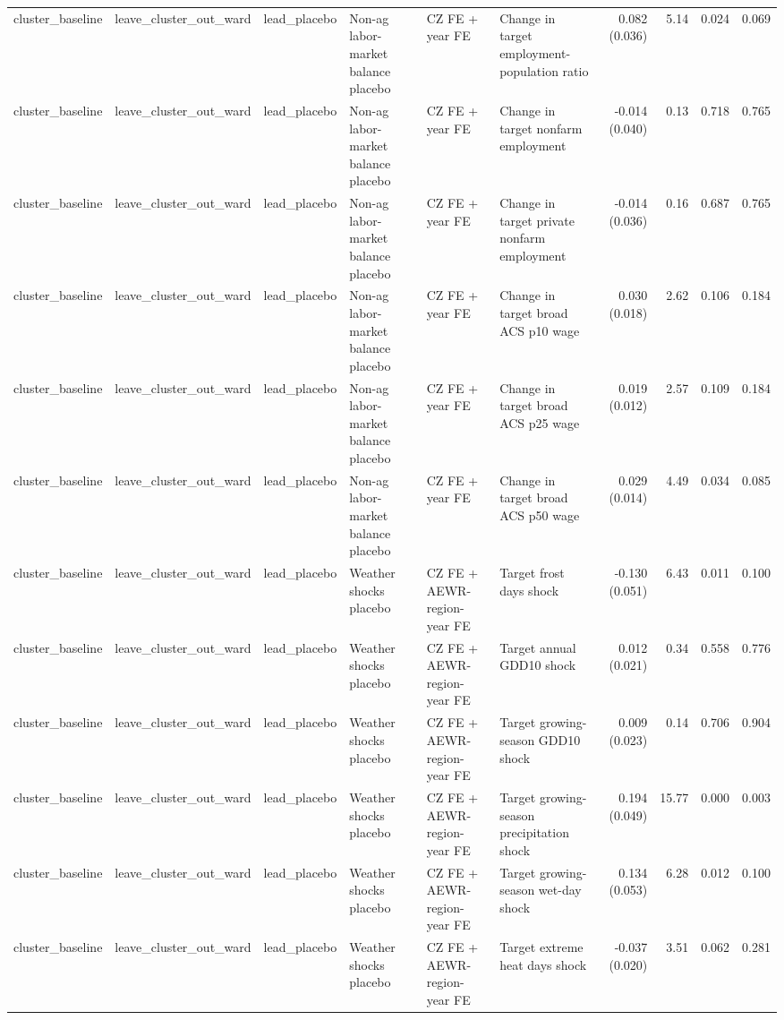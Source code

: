 \begin{tabular}{llllllrrrr}
cluster_baseline & leave_cluster_out_ward & lead_placebo & Non-ag labor-market balance placebo & CZ FE + year FE & Change in target employment-population ratio & 0.082 (0.036) & 5.14 & 0.024 & 0.069 \\
cluster_baseline & leave_cluster_out_ward & lead_placebo & Non-ag labor-market balance placebo & CZ FE + year FE & Change in target nonfarm employment & -0.014 (0.040) & 0.13 & 0.718 & 0.765 \\
cluster_baseline & leave_cluster_out_ward & lead_placebo & Non-ag labor-market balance placebo & CZ FE + year FE & Change in target private nonfarm employment & -0.014 (0.036) & 0.16 & 0.687 & 0.765 \\
cluster_baseline & leave_cluster_out_ward & lead_placebo & Non-ag labor-market balance placebo & CZ FE + year FE & Change in target broad ACS p10 wage & 0.030 (0.018) & 2.62 & 0.106 & 0.184 \\
cluster_baseline & leave_cluster_out_ward & lead_placebo & Non-ag labor-market balance placebo & CZ FE + year FE & Change in target broad ACS p25 wage & 0.019 (0.012) & 2.57 & 0.109 & 0.184 \\
cluster_baseline & leave_cluster_out_ward & lead_placebo & Non-ag labor-market balance placebo & CZ FE + year FE & Change in target broad ACS p50 wage & 0.029 (0.014) & 4.49 & 0.034 & 0.085 \\
cluster_baseline & leave_cluster_out_ward & lead_placebo & Weather shocks placebo & CZ FE + AEWR-region-year FE & Target frost days shock & -0.130 (0.051) & 6.43 & 0.011 & 0.100 \\
cluster_baseline & leave_cluster_out_ward & lead_placebo & Weather shocks placebo & CZ FE + AEWR-region-year FE & Target annual GDD10 shock & 0.012 (0.021) & 0.34 & 0.558 & 0.776 \\
cluster_baseline & leave_cluster_out_ward & lead_placebo & Weather shocks placebo & CZ FE + AEWR-region-year FE & Target growing-season GDD10 shock & 0.009 (0.023) & 0.14 & 0.706 & 0.904 \\
cluster_baseline & leave_cluster_out_ward & lead_placebo & Weather shocks placebo & CZ FE + AEWR-region-year FE & Target growing-season precipitation shock & 0.194 (0.049) & 15.77 & 0.000 & 0.003 \\
cluster_baseline & leave_cluster_out_ward & lead_placebo & Weather shocks placebo & CZ FE + AEWR-region-year FE & Target growing-season wet-day shock & 0.134 (0.053) & 6.28 & 0.012 & 0.100 \\
cluster_baseline & leave_cluster_out_ward & lead_placebo & Weather shocks placebo & CZ FE + AEWR-region-year FE & Target extreme heat days shock & -0.037 (0.020) & 3.51 & 0.062 & 0.281 \\

\end{tabular}
